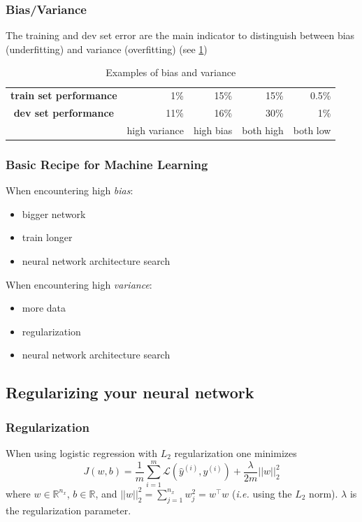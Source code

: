 \documentclass{article}
\begin{document}
\subsubsection{Bias/Variance}
The training and dev set error are the main indicator to distinguish between
bias (underfitting) and variance (overfitting) (see \cref{tbl:biasvariance})
\begin{table}[htbp]
  \begin{center}
    \begin{tabular}{crrrr}\toprule
      \textbf{train set performance} &  1\% & 15\% & 15\% & 0.5\%\\
      \textbf{dev set performance}   & 11\% & 16\% & 30\% & 1\%\\\midrule
      & high variance & high bias & both high & both low\\\bottomrule
    \end{tabular}
    \caption{Examples of bias and variance\label{tbl:biasvariance}}
  \end{center}
\end{table}

\subsubsection{Basic Recipe for Machine Learning}
When encountering high \emph{bias}:
\begin{itemize}
  \item bigger network
  \item train longer
  \item neural network architecture search
\end{itemize}
When encountering high \emph{variance}:
\begin{itemize}
  \item more data
  \item regularization
  \item neural network architecture search
\end{itemize}

\subsection{Regularizing your neural network}
\subsubsection{Regularization}
When using logistic regression with $L_2$ regularization one minimizes
\begin{equation}
  J(w,b)=\frac{1}{m}\sum_{i=1}^m\mathcal{L}(\hat{y}^{(i)},y^{(i)})+\frac{\lambda}{2m}||w||_2^2
\end{equation}
where $w\in\mathbb{R}^{n_x}$, $b\in\mathbb{R}$, and $||w||_2^2=\sum_{j=1}^{n_x}w_j^2=w^\top w$
(\emph{i.e.} using the $L_2$ norm).
$\lambda$ is the regularization parameter.
\end{document}
